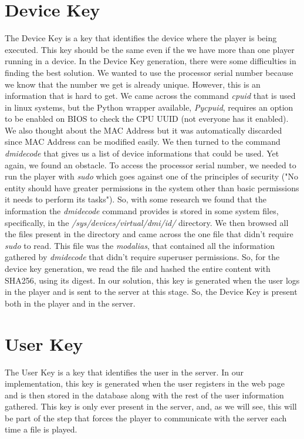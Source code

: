 \documentclass[11pt,a4paper]{report}
\begin{document}
\section{Device Key}
The Device Key is a key that identifies the device where the player is being executed. This key should be the same even if the we have more than one player running in a device.
In the Device Key generation, there were some difficulties in finding the best solution.
\newline We wanted to use the processor serial number because we know that the number we get is already unique.
However, this is an information that is hard to get. We came across the command \emph{cpuid} that is used in linux systems, but the Python wrapper available, \emph{Pycpuid}, requires an option to be enabled on BIOS to check the CPU UUID (not everyone has it enabled).
We also thought about the MAC Address but it was automatically discarded since MAC Address can be modified easily.
\newline We then turned to the command \emph{dmidecode} that gives us a list of device informations that could be used. 
Yet again, we found an obstacle. To access the processor serial number, we needed to run the player with \emph{sudo} which goes against one of the principles of security ("No entity should have greater permissions in the system other than basic permissions it needs to perform its tasks").
So, with some research we found that the information the \emph{dmidecode} command provides is stored in some system files, specifically, in the \emph{/sys/devices/virtual/dmi/id/} directory.
We then browsed all the files present in the directory and came across the one file that didn't require \emph{sudo} to read. 
This file was the \emph{modalias}, that contained all the information gathered by \emph{dmidecode} that didn't require superuser permissions.
\newline So, for the device key generation, we read the file and hashed the entire content with SHA256, using its digest.
\newline In our solution, this key is generated when the user logs in the player and is sent to the server at this stage. So, the Device Key is present both in the player and in the server.

\section{User Key}
The User Key is a key that identifies the user in the server. 
In our implementation, this key is generated when the user registers in the web page and is then stored in the database along with the rest of the user information gathered.
This key is only ever present in the server, and, as we will see, this will be part of the step that forces the player to communicate with the server each time a file is played.
\end{document}
